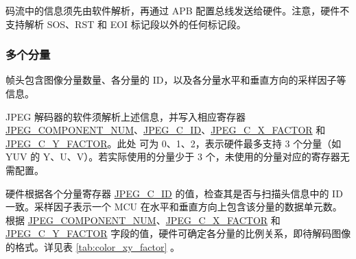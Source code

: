 \documentclass[main\_\_CN.tex]{subfiles}
\begin{document}
码流中的信息须先由软件解析，再通过 APB 配置总线发送给硬件。注意，硬件不支持解析 SOS、RST 和 EOI 标记段以外的任何标记段。

\subsubsection{多个分量}
\label{sec:jpegcodec-dec-color_components}


帧头包含图像分量数量、各分量的 ID，以及各分量水平和垂直方向的采样因子等信息。

JPEG 解码器的软件须解析上述信息，并写入相应寄存器 \hyperref[fielddesc:JPEGCOMPONENTNUM]{JPEG\_COMPONENT\_NUM}、\hyperref[regdesc:JPEGC0REG]{JPEG\_C\_ID}、\hyperref[fielddesc:JPEGC0XFACTOR]{JPEG\_C\_X\_FACTOR} 和 \hyperref[fielddesc:JPEGC0YFACTOR]{JPEG\_C\_Y\_FACTOR}。此处  可为 0、1、2，表示硬件最多支持 3 个分量（如 YUV 的 Y、U、V）。若实际使用的分量少于 3 个，未使用的分量对应的寄存器无需配置。

硬件根据各个分量寄存器 \hyperref[regdesc:JPEGC0REG]{JPEG\_C\_ID} 的值，检查其是否与扫描头信息中的 ID 一致。采样因子表示一个 MCU 在水平和垂直方向上包含该分量的数据单元数。根据 \hyperref[fielddesc:JPEGCOMPONENTNUM]{JPEG\_COMPONENT\_NUM}、\hyperref[fielddesc:JPEGC0XFACTOR]{JPEG\_C\_X\_FACTOR} 和 \hyperref[fielddesc:JPEGC0YFACTOR]{JPEG\_C\_Y\_FACTOR} 字段的值，硬件可确定各分量的比例关系，即待解码图像的格式。详见表 \ref{tab:color_xy_factor} \textit{}。
\end{document}
